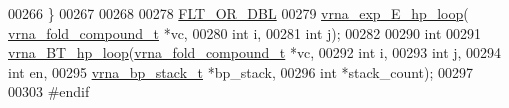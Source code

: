 \begin{DoxyCode}
00266 \}
00267 
00268 
00278 \hyperlink{group__data__structures_ga31125aeace516926bf7f251f759b6126}{FLT\_OR\_DBL}
00279 \hyperlink{group__loops_gac9f49b31d3ec1d9040798b05506c71da}{vrna\_exp\_E\_hp\_loop}( \hyperlink{group__fold__compound_structvrna__fc__s}{vrna\_fold\_compound\_t} *vc,
00280                     \textcolor{keywordtype}{int} i,
00281                     \textcolor{keywordtype}{int} j);
00282 
00290 \textcolor{keywordtype}{int}
00291 \hyperlink{group__loops_ga6c4ba14d24f716d0ca9021771357e903}{vrna\_BT\_hp\_loop}(\hyperlink{group__fold__compound_structvrna__fc__s}{vrna\_fold\_compound\_t} *vc,
00292                 \textcolor{keywordtype}{int} i,
00293                 \textcolor{keywordtype}{int} j,
00294                 \textcolor{keywordtype}{int} en,
00295                 \hyperlink{group__data__structures_structvrna__bp__stack__s}{vrna\_bp\_stack\_t} *bp\_stack,
00296                 \textcolor{keywordtype}{int}   *stack\_count);
00297 
00303 \textcolor{preprocessor}{#endif}
\end{DoxyCode}

